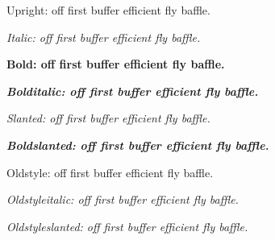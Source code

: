 \documentclass{article}
\begin{document}
Upright: off first buffer efficient fly baffle.

\textit{Italic: off first buffer efficient fly baffle.}

\textbf{Bold: off first buffer efficient fly baffle.}

\textbf{\textit{Bolditalic: off first buffer efficient fly baffle.}}

\textsl{Slanted: off first buffer efficient fly baffle.}

\textbf{\textsl{Boldslanted: off first buffer efficient fly baffle.}}

{\selectfont Oldstyle: off first buffer efficient fly baffle.

\textit{Oldstyleitalic: off first buffer efficient fly baffle.}

\textsl{Oldstyleslanted: off first buffer efficient fly baffle.}\par}
\end{document}
